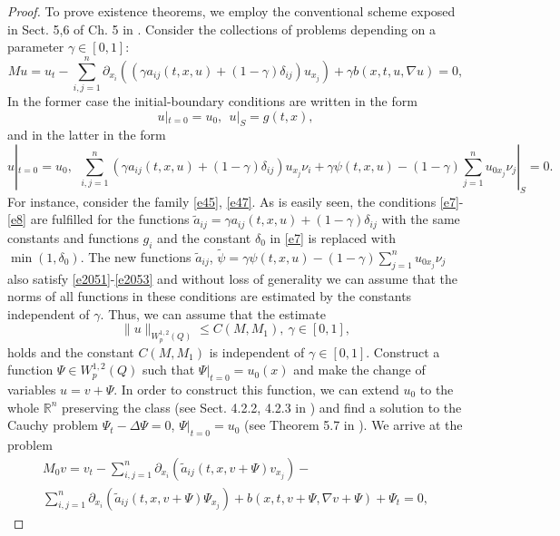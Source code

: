 \documentclass{article}
\theoremstyle{plain}
\begin{document}
\begin{proof}
To prove existence theorems, we employ the conventional scheme exposed in  Sect.  5,6 of Ch. 5 in  \cite{lad}. 
Consider the collections of problems depending on a parameter  $\gamma\in [0,1]$:
\begin{equation}\label{e45}
	Mu= u_t-\sum_{i,j=1}^n \partial_{x_i}((\gamma a_{ij}(t,x,u)+(1-\gamma)\delta_{ij})u_{x_j})+ \gamma b(x,t,u,\nabla u)=0,
\end{equation}
In the former case the initial-boundary conditions are written in the form 
\begin{equation}\label{e46}
	u|_{t=0}=u_0,\ \ u|_{S}= g(t,x), 
\end{equation}
and in the latter in the form 
\begin{equation}\label{e47}
	u|_{t=0}=u_0,\ \  \sum_{i,j=1}^n (\gamma a_{ij}(t,x,u)+(1-\gamma)\delta_{ij}) u_{x_j}\nu_i+ \gamma \psi(t,x,u)-(1-\gamma)\sum_{j=1}^n u_{0x_j}\nu_j  |_{S}=0.  
\end{equation}
For instance, consider the family   \eqref{e45}, \eqref{e47}.
As is easily seen, the conditions  \eqref{e7}-\eqref{e8} are fulfilled for the functions  $\tilde{a}_{ij}=\gamma a_{ij}(t,x,u)+(1-\gamma)\delta_{ij}$
 with the same constants and functions  $g_i$ and the constant  $\delta_0$ in \eqref{e7} is replaced with  $\min(1,\delta_0)$.
The new functions $\tilde{a}_{ij}$, $\tilde{\psi}=\gamma \psi(t,x,u)-(1-\gamma)\sum_{j=1}^n u_{0x_j}\nu_j$ also satisfy 
 \eqref{e2051}-\eqref{e2053} and without loss of generality we can assume that 
 the norms of all  functions in these conditions are estimated by the constants independent of 
 $\gamma$. 
Thus, we can assume that the estimate
\begin{equation}\label{e48}
\|u\|_{W_p^{1,2}(Q)}\leq C(M,M_1),\  \gamma\in [0,1],
\end{equation}
holds and the constant   $C(M,M_1)$ is independent of  $\gamma\in [0,1]$. 
 Construct a function  $\Psi\in W_p^{1,2}(Q)$ such that  $\Psi|_{t=0}=u_0(x)$ and make the change of variables   $u=v+\Psi$. 
In order to construct this function, we can extend  $u_0$ to the whole  ${\mathbb R}^n$ preserving the class  (see Sect. 4.2.2, 4.2.3 in \cite{tri}) and find a solution  
to the Cauchy problem  $\Psi_t-\Delta \Psi=0$, $\Psi|_{t=0}=u_0$ (see Theorem 5.7 in  \cite{denk}).
We arrive at the problem 
\begin{multline}\label{e49}
	M_0v= v_t-\sum_{i,j=1}^n \partial_{x_i}(\tilde{a}_{ij}(t,x,v+\Psi)v_{x_j})- \\ \sum_{i,j=1}^n \partial_{x_i}(\tilde{a}_{ij}(t,x,v+\Psi)\Psi_{x_j}) + {b}(x,t,v+\Psi,\nabla v+\Psi)+\Psi_t=0,

\end{multline}
\end{proof}
\end{document}
